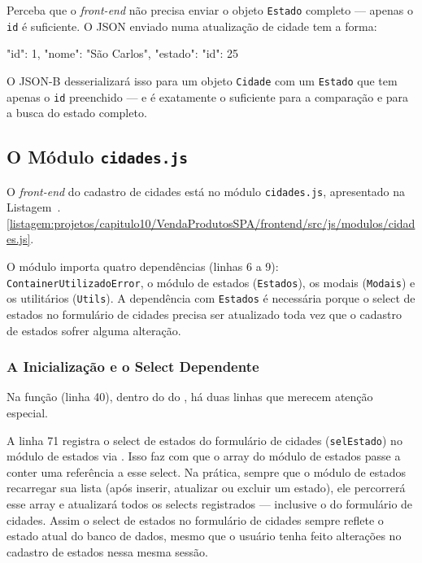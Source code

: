 Perceba que o \textit{front-end} não precisa enviar o objeto \texttt{Estado} completo --- apenas o \texttt{id} é suficiente. O JSON enviado numa atualização de cidade tem a forma:

\begin{boxJsonCode}[title=Exemplo de JSON enviado pelo PUT de cidades]
{
  "id": 1,
  "nome": "São Carlos",
  "estado": { "id": 25 }
}
\end{boxJsonCode}

O JSON-B desserializará isso para um objeto \texttt{Cidade} com um \texttt{Estado} que tem apenas o \texttt{id} preenchido --- e é exatamente o suficiente para a comparação e para a busca do estado completo.


\subsection{O Módulo \texttt{cidades.js}}

O \textit{front-end} do cadastro de cidades está no módulo \texttt{cidades.js}, apresentado na Listagem~\thechapter.\ref{listagem:projetos/capitulo10/VendaProdutosSPA/frontend/src/js/modulos/cidades.js}.


O módulo importa quatro dependências (linhas 6 a 9): \texttt{ContainerUtilizadoError}, o módulo de estados (\texttt{Estados}), os modais (\texttt{Modais}) e os utilitários (\texttt{Utils}). A dependência com \texttt{Estados} é necessária porque o select de estados no formulário de cidades precisa ser atualizado toda vez que o cadastro de estados sofrer alguma alteração.

\subsubsection{A Inicialização e o Select Dependente}

Na função  (linha 40), dentro do  do , há duas linhas que merecem atenção especial.

A linha 71 registra o select de estados do formulário de cidades (\texttt{selEstado}) no módulo de estados via . Isso faz com que o array  do módulo de estados passe a conter uma referência a esse select. Na prática, sempre que o módulo de estados recarregar sua lista (após inserir, atualizar ou excluir um estado), ele percorrerá esse array e atualizará todos os selects registrados --- inclusive o do formulário de cidades. Assim o select de estados no formulário de cidades sempre reflete o estado atual do banco de dados, mesmo que o usuário tenha feito alterações no cadastro de estados nessa mesma sessão.

